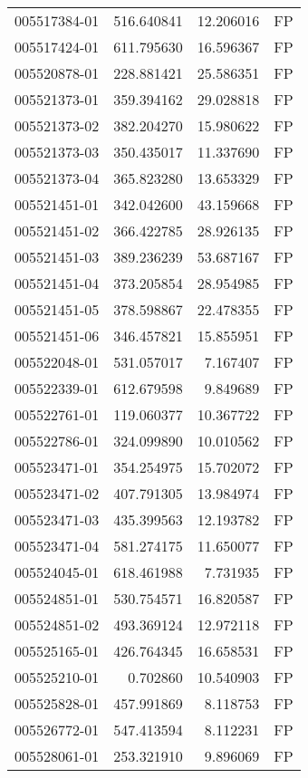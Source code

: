\begin{tabular}{lrrl}
005517384-01 &  516.640841 &    12.206016 &   FP \\
005517424-01 &  611.795630 &    16.596367 &   FP \\
005520878-01 &  228.881421 &    25.586351 &   FP \\
005521373-01 &  359.394162 &    29.028818 &   FP \\
005521373-02 &  382.204270 &    15.980622 &   FP \\
005521373-03 &  350.435017 &    11.337690 &   FP \\
005521373-04 &  365.823280 &    13.653329 &   FP \\
005521451-01 &  342.042600 &    43.159668 &   FP \\
005521451-02 &  366.422785 &    28.926135 &   FP \\
005521451-03 &  389.236239 &    53.687167 &   FP \\
005521451-04 &  373.205854 &    28.954985 &   FP \\
005521451-05 &  378.598867 &    22.478355 &   FP \\
005521451-06 &  346.457821 &    15.855951 &   FP \\
005522048-01 &  531.057017 &     7.167407 &   FP \\
005522339-01 &  612.679598 &     9.849689 &   FP \\
005522761-01 &  119.060377 &    10.367722 &   FP \\
005522786-01 &  324.099890 &    10.010562 &   FP \\
005523471-01 &  354.254975 &    15.702072 &   FP \\
005523471-02 &  407.791305 &    13.984974 &   FP \\
005523471-03 &  435.399563 &    12.193782 &   FP \\
005523471-04 &  581.274175 &    11.650077 &   FP \\
005524045-01 &  618.461988 &     7.731935 &   FP \\
005524851-01 &  530.754571 &    16.820587 &   FP \\
005524851-02 &  493.369124 &    12.972118 &   FP \\
005525165-01 &  426.764345 &    16.658531 &   FP \\
005525210-01 &    0.702860 &    10.540903 &   FP \\
005525828-01 &  457.991869 &     8.118753 &   FP \\
005526772-01 &  547.413594 &     8.112231 &   FP \\
005528061-01 &  253.321910 &     9.896069 &   FP \\

\end{tabular}
